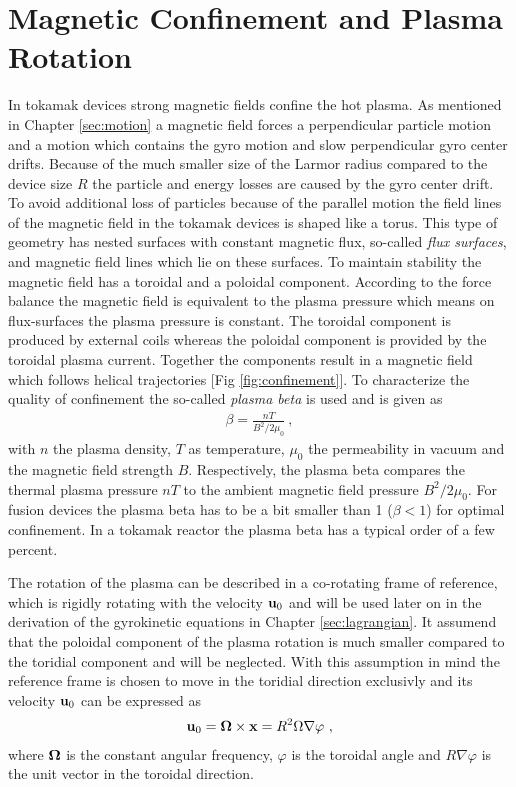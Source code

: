 \newpage
\section{Magnetic Confinement and Plasma Rotation}
\label{sec:confinement}

In tokamak devices strong magnetic fields confine the hot plasma. As mentioned in Chapter \ref{sec:motion} a magnetic field forces a perpendicular particle motion and a motion which contains the gyro motion and slow perpendicular gyro center drifts. Because of the much smaller size of the Larmor radius compared to the device size $R$ the particle and energy losses are caused by the gyro center drift. To avoid additional loss of particles because of the parallel motion the field lines of the magnetic field in the tokamak devices is shaped like a torus. This type of geometry has nested surfaces with constant magnetic flux, so-called \textit{flux surfaces}, and magnetic field lines which lie on these surfaces. To maintain stability the magnetic field has a toroidal and a poloidal component. According to the force balance the magnetic field is equivalent to the plasma pressure which means on flux-surfaces the plasma pressure is constant. \cite{Stroth2018, Wesson2004} The toroidal component is produced by external coils whereas the poloidal component is provided by the toroidal plasma current. Together the components result in a magnetic field which follows helical trajectories [Fig \ref{fig:confinement}]. To characterize the quality of confinement the so-called \textit{plasma beta} is used and is given as
\begin{gather}
    \beta = \frac{nT}{B^2/2\mu_0}~,
\end{gather} 
with $n$ the plasma density, $T$ as temperature, $\mu_0$ the permeability in vacuum and the magnetic field strength $B$. Respectively, the plasma beta compares the thermal plasma pressure $nT$ to the ambient magnetic field pressure $B^2/2\mu_0 $. For fusion devices the plasma beta has to be a bit smaller than 1 ($\beta < 1$) for optimal confinement. In a tokamak reactor the plasma beta has a typical order of a few percent. \cite{Wesson2004}
\bigskip

The rotation of the plasma can be described in a co-rotating frame of reference, which is rigidly rotating with the velocity $\boldsymbol{\mathbf{u}}_0$ and will be used later on in the derivation of the gyrokinetic equations in Chapter \ref{sec:lagrangian}. It assumend that the poloidal component of the plasma rotation is much smaller compared to the toridial component and will be neglected. With this assumption in mind the reference frame is chosen to move in the toridial direction exclusivly and its velocity $\boldsymbol{\mathbf{u}}_0$ can be expressed as
\begin{gather}
    \boldsymbol{\mathbf{u}}_0 = \boldsymbol{\mathbf{\Omega}} \times \boldsymbol{\mathbf{x}} = R^2 \Omega \nabla \varphi~,
    \label{eq:rotvelocity}
\end{gather}
where $\boldsymbol{\mathbf{\Omega}}$ is the constant angular frequency, $\varphi$ is the toroidal angle and $R \nabla\varphi$ is the unit vector in the toroidal direction. 

